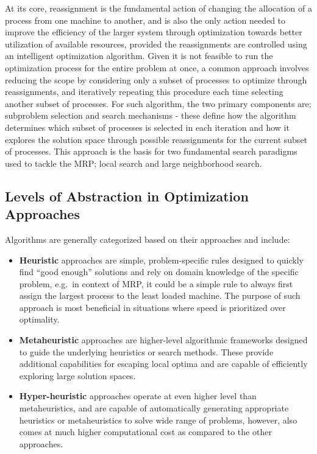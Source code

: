 \documentclass[a4paper,12pt]{Classes/RoboticsLaTeX}
\begin{document}
At its core, reassignment is the fundamental action of changing the
allocation of a process from one machine to another, and is also the
only action needed to improve the efficiency of the larger system
through optimization towards better utilization of available resources,
provided the reassignments are controlled using an intelligent
optimization algorithm. Given it is not feasible to run the optimization
process for the entire problem at once, a common approach involves
reducing the scope by considering only a subset of processes to optimize
through reassignments, and iteratively repeating this procedure each
time selecting another subset of processes. For such algorithm, the two
primary components are; subproblem selection and search mechanisms -
these define how the algorithm determines which subset of processes is
selected in each iteration and how it explores the solution space
through possible reassignments for the current subset of processes. This
approach is the basis for two fundamental search paradigms used to
tackle the MRP; local search and large neighborhood search. \cite{pirlotGeneralLocalSearch1996}

\subsection{Levels of Abstraction in Optimization Approaches}

Algorithms are generally categorized based on their approaches \cite{wreford2024} and include:

\begin{itemize}
\item
  \textbf{Heuristic} approaches are simple, problem-specific rules
  designed to quickly find ``good enough'' solutions and rely on domain
  knowledge of the specific problem, e.g.~in context of MRP, it could be
  a simple rule to always first assign the largest process to the least
  loaded machine. The purpose of such approach is most beneficial in
  situations where speed is prioritized over optimality.
\item
  \textbf{Metaheuristic} approaches are higher-level algorithmic
  frameworks designed to guide the underlying heuristics or search
  methods. These provide additional capabilities for escaping local
  optima and are capable of efficiently exploring large solution spaces.
\item
  \textbf{Hyper-heuristic} approaches operate at even higher level than
  metaheuristics, and are capable of automatically generating
  appropriate heuristics or metaheuristics to solve wide range of
  problems, however, also comes at much higher computational cost as
  compared to the other approaches.
\end{itemize}
\end{document}
